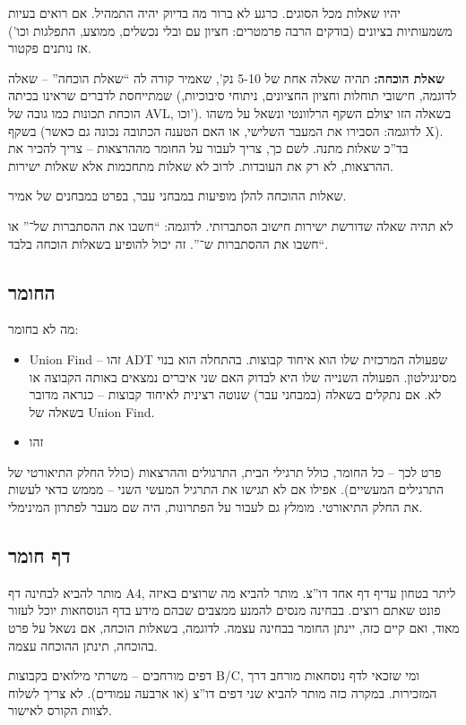 \documentclass[]{article}
\theoremstyle{definition}
\begin{document}
	יהיו שאלות מכל הסוגים. כרגע לא ברור מה בדיוק יהיה התמהיל. אם רואים בעיות משמעותיות בציונים (בודקים הרבה פרמטרים: חציון עם ובלי נכשלים, ממוצע, התפלגות וכו') אז נותנים פקטור. 
	
	\textbf{שאלת הוכחה: }תהיה שאלה אחת של 5-10 נק', שאמיר קורה לה ``שאלת הוכחה'' – שאלה שמתייחסת לדברים שראינו בכיתה (לדוגמה, חישובי תוחלות וחציון החציונים, ניתוחי סיבוכיות, הוכחת תכונות כמו גובה של AVL, וכו'). בשאלה הזו יצולם השקף הרלוונטי ונשאל על משהו בשקף (לדוגמה: הסבירו את המעבר השלישי, או האם הטענה הכתובה נכונה גם כאשר X). בד''כ שאלות מתנה. לשם כך, צריך לעבור על החומר מההרצאות – צריך להכיר את ההרצאות, לא רק את העובדות. לרוב לא שאלות מתחכמות אלא שאלות ישירות. 
	
	שאלות ההוכחה להלן מופיעות במבחני עבר, בפרט במבחנים של אמיר. 
	
	לא תהיה שאלה שדורשת ישירות חישוב הסתברותי. לדוגמה: ``חשבו את ההסתברות של־'' או ``חשבו את ההסתברות ש־''. זה יכול להופיע בשאלות הוכחה בלבד. 
	
	\subsection{החומר}
	מה לא בחומר: 
	\begin{itemize}
		\item Union Find – זהו ADT שפעולה המרכזית שלו הוא איחוד קבוצות. בהתחלה הוא בנוי מסינגילטון. הפעולה השנייה שלו היא לבדוק האם שני איברים נמצאים באותה הקבוצה או לא. אם נתקלים בשאלה (במבחני עבר) שנוטה רצינית לאיחוד קבוצות – כנראה מדובר בשאלה של Union Find. 
		\item זהו
	\end{itemize}
	
	פרט לכך – כל החומר, כולל תרגילי הבית, התרגולים וההרצאות (כולל החלק התיאורטי של התרגילים המעשיים). אפילו אם לא תגישו את התרגיל המעשי השני – מממש כדאי לעשות את החלק התיאורטי. מומלץ גם לעבור על הפתרונות, היה שם מעבר לפתרון המינימלי. 
	
	\subsection{דף חומר}
	מותר להביא לבחינה דף A4, ליתר בטחון עדיף דף אחד דו''צ. מותר להביא מה שרוצים באיזה פונט שאתם רוצים. בבחינה מנסים להמנע ממצבים שבהם מידע בדף הנוסחאות יוכל לעזור מאוד, ואם קיים כזה, יינתן החומר בבחינה עצמה. לדוגמה, בשאלות הוכחה, אם נשאל על פרט בהוכחה, תינתן ההוכחה עצמה. 
	
	דפים מורחבים – משרתי מילואים בקבוצות B/C, ומי שזכאי לדף נוסחאות מורחב דרך המזכירות. במקרה כזה מותר להביא שני דפים דו''צ (או ארבעה עמודים). לא צריך לשלוח לצוות הקורס לאישור. 
	
\end{document}
